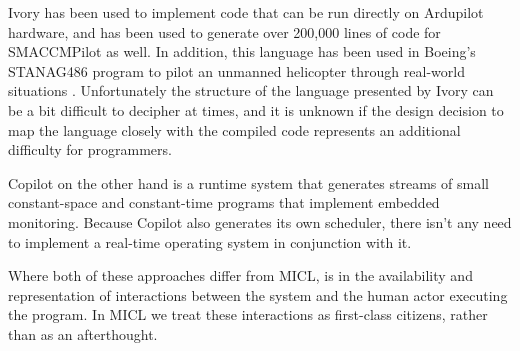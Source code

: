 \documentclass{sig-alternate-05-2015}
\begin{document}
Ivory has been used to implement code that can be run directly on Ardupilot
hardware, and has been used to generate over 200,000 lines of code for
SMACCMPilot as well. In addition, this language has been used in Boeing's
STANAG486 program to pilot an unmanned helicopter through real-world
situations \cite{boeing2016auto}. Unfortunately the structure of the language
presented by Ivory can be a bit difficult to decipher at times, and it is
unknown if the design decision to map the language closely with the compiled
code represents an additional difficulty for programmers.

Copilot on the other hand is a runtime system that generates streams of small
constant-space and constant-time  programs that implement embedded
monitoring. Because Copilot also generates its own scheduler, there isn't any
need to implement a real-time operating system in conjunction with it.

Where both of these approaches differ from MICL, is in the availability and
representation of interactions between the system and the human actor
executing the program. In MICL we treat these interactions as first-class
citizens, rather than as an afterthought.




\end{document}
